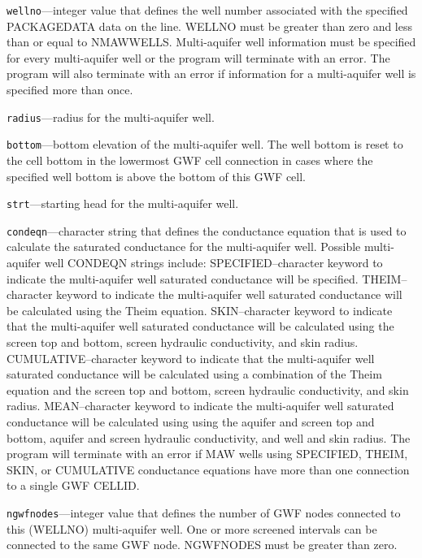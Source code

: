 \begin{description}
\item \texttt{wellno}---integer value that defines the well number associated with the specified PACKAGEDATA data on the line. WELLNO must be greater than zero and less than or equal to NMAWWELLS. Multi-aquifer well information must be specified for every multi-aquifer well or the program will terminate with an error.  The program will also terminate with an error if information for a multi-aquifer well is specified more than once.

\item \texttt{radius}---radius for the multi-aquifer well.

\item \texttt{bottom}---bottom elevation of the multi-aquifer well. The well bottom is reset to the cell bottom in the lowermost GWF cell connection in cases where the specified well bottom is above the bottom of this GWF cell.

\item \texttt{strt}---starting head for the multi-aquifer well.

\item \texttt{condeqn}---character string that defines the conductance equation that is used to calculate the saturated conductance for the multi-aquifer well. Possible multi-aquifer well CONDEQN strings include: SPECIFIED--character keyword to indicate the multi-aquifer well saturated conductance will be specified.  THEIM--character keyword to indicate the multi-aquifer well saturated conductance will be calculated using the Theim equation.  SKIN--character keyword to indicate that the multi-aquifer well saturated conductance will be calculated using the screen top and bottom, screen hydraulic conductivity, and skin radius.    CUMULATIVE--character keyword to indicate that the multi-aquifer well saturated conductance will be calculated using a combination of the Theim equation and the screen top and bottom, screen hydraulic conductivity, and skin radius.  MEAN--character keyword to indicate the multi-aquifer well saturated conductance will be calculated using using the aquifer and screen top and bottom, aquifer and screen hydraulic conductivity, and well and skin radius. The program will terminate with an error if MAW wells using SPECIFIED, THEIM, SKIN, or CUMULATIVE conductance equations have more than one connection to a single GWF CELLID.

\item \texttt{ngwfnodes}---integer value that defines the number of GWF nodes connected to this (WELLNO) multi-aquifer well. One or more screened intervals can be connected to the same GWF node. NGWFNODES must be greater than zero.


\end{description}
